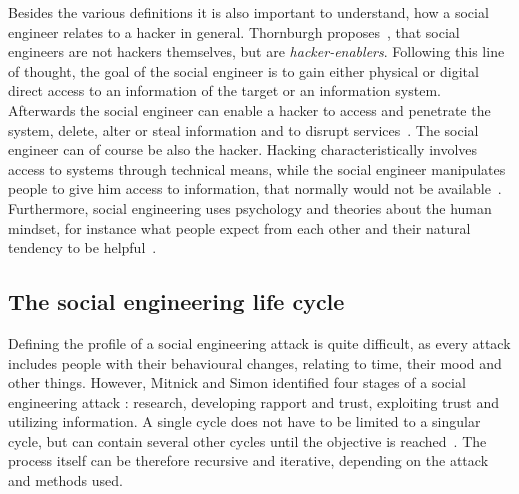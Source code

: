 Besides the various definitions it is also important to understand, how a
social engineer relates to a hacker in general. Thornburgh
proposes~\cite{thornburgh2004}, that social engineers are not hackers
themselves, but are \textit{hacker-enablers}. Following this line of thought,
the goal of the social engineer is to gain either physical or digital direct
access to an information of the target or an information system. Afterwards the
social engineer can enable a hacker to access and penetrate the system, delete,
alter or steal information and to disrupt services~\cite{thornburgh2004}. The
social engineer can of course be also the hacker. Hacking characteristically
involves access to systems through technical means, while the social engineer
manipulates people to give him access to information, that normally would not
be available~\cite{jones2004}. Furthermore, social engineering uses psychology
and theories about the human mindset, for instance what people expect from each other
and their natural tendency to be helpful~\cite{jones2004}.


\subsection{The social engineering life cycle}

Defining the profile of a social engineering attack is quite difficult, as
every attack includes people with their behavioural changes, relating to time,
their mood and other things. However, Mitnick and Simon identified four stages
of a social engineering attack \cite{mitnick2003}: research, developing rapport
and trust, exploiting trust and utilizing information. A single cycle does not
have to be limited to a singular cycle, but can contain several other cycles
until the objective is reached~\cite{thornburgh2004}. The process itself can be
therefore recursive and iterative, depending on the attack and methods used.


